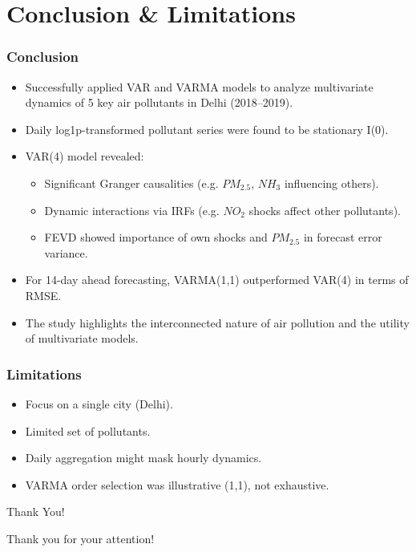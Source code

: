 \documentclass[svgnames, 12pt]{beamer}
\begin{document}
\section{Conclusion \& Limitations}
\begin{frame}
    \frametitle{Conclusion}
    \begin{itemize}
        \item Successfully applied VAR and VARMA models to analyze multivariate dynamics of 5 key air pollutants in Delhi (2018--2019).
        \item Daily log1p-transformed pollutant series were found to be stationary I(0).
        \item VAR(4) model revealed:
            \begin{itemize}
                \item Significant Granger causalities (e.g. $PM_{2.5}$, $NH_3$ influencing others).
                \item Dynamic interactions via IRFs (e.g. $NO_2$ shocks affect other pollutants).
                \item FEVD showed importance of own shocks and $PM_{2.5}$ in forecast error variance.
            \end{itemize}
        \item For 14-day ahead forecasting, VARMA(1,1) outperformed VAR(4) in terms of RMSE.
        \item The study highlights the interconnected nature of air pollution and the utility of multivariate models.
    \end{itemize}
\end{frame}

\begin{frame}
    \frametitle{Limitations}
    \begin{itemize}
        \item Focus on a single city (Delhi).
        \item Limited set of pollutants.
        \item Daily aggregation might mask hourly dynamics.
        \item VARMA order selection was illustrative (1,1), not exhaustive.
    \end{itemize}
\end{frame}

\begin{frame}{Thank You!}
	\begin{center}
		\Huge Thank you for your attention!
	\end{center}
\end{frame}

\end{document}
